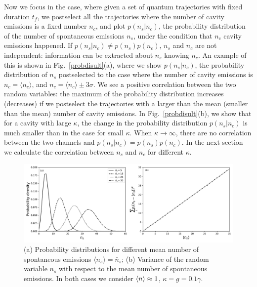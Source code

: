 \documentclass[%
 reprint,
 amsmath,amssymb,
 aps, 
]{revtex4-1}
\begin{document}
Now we focus in the case, where given a set of quantum trajectories
with fixed duration $t_f$, we postselect all the trajectories where the
number of cavity emissions is a fixed number $n_c$, and plot
$p(n_s|n_c)$, the probability distribution of the number of spontaneous
emissions $n_s$, under the condition that $n_c$ cavity emissions
happened. If $p(n_s|n_c)\neq p(n_s)p(n_c)$, $n_s$ and $n_c$ are not
independent: information can be extracted about $n_s$ knowing $n_c$.
An example of this is shown in Fig.~\ref{probdisult}(a), where we
show $p(n_s|n_c)$, the probability distribution of $n_s$ postselected
to the case where the number of cavity emissions is
$n_c=\langle n_c \rangle$, and $n_c=\langle n_c \rangle\pm 3 \sigma$. We
see a positive correlation between the two random variables: the
maximum of the probability distribution increases (decreases) if we
postselect the trajectories with a larger than the mean (smaller than
the mean) number of cavity emissions. In Fig.~\ref{probdisult}(b), we
show that for a cavity with large $\kappa$, the change in the
probability distribution $p(n_s|n_c)$ is much smaller than in the case
for small $\kappa$. When
$\kappa\rightarrow\infty$, there are no correlation between the two
channels and $p(n_s|n_c)=p(n_s)p(n_c)$.
In the next section we calculate the correlation between $n_s$ and
$n_c$ for different $\kappa$.

\begin{center}
\begin{figure}[!t]
\includegraphics[scale = 0.5]{newerrorppp.pdf}
\caption{(a) Probability distributions for different mean number of
  spontaneous emissions $\langle n_s\rangle=\bar{n}_s$; (b)
  Variance of the random variable $n_s$ with respect to the mean number of
  spontaneous emissions. In both cases we consider
  $\expval{n} \approx 1$,  $\kappa = g = 0.1\gamma$.} \label{error2}
\end{figure}
\end{center}
\end{document}
